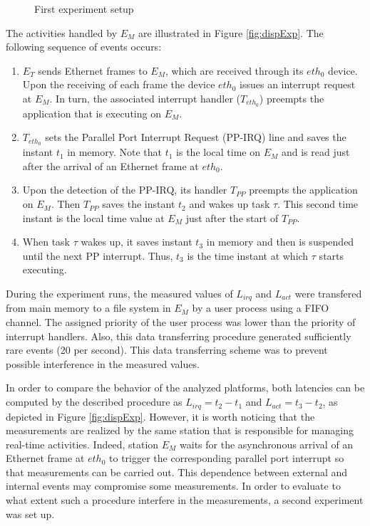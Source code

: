 \documentclass{acm_proc_article-sp}
\begin{document}
\begin{figure}[tbh]
  \centering {\scalebox{1}{}}
  \caption{First experiment setup}
  \label{fig:config}
\end{figure}

The activities handled by $E_M$ are illustrated in Figure \ref{fig:dispExp}. The
following sequence of events occurs:

\begin{enumerate}
\item $E_T$ sends Ethernet frames to $E_M$, which are received through its $eth_0$
  device. Upon the receiving of each frame the device $eth_0$ issues an interrupt
  request at $E_M$. In turn, the associated interrupt handler ($T_{eth_0}$) preempts
  the application that is executing on $E_M$.

\item $T_{eth_0}$ sets the Parallel Port Interrupt Request (PP-IRQ) line and
    saves the instant $t_1$ in memory. Note that $t_1$ is the local time on $E_M$
  and is read just after the arrival of an Ethernet frame at $eth_0$.

\item Upon the detection of the PP-IRQ, its handler $T_{PP}$ preempts the
  application on $E_M$.  Then $T_{PP}$ saves the instant $t_2$ and wakes up task
  $\tau$. This second time instant is the local time value at $E_M$ just after the
  start of $T_{PP}$.
  
\item When task $\tau$ wakes up, it saves instant $t_3$ in memory and then is
  suspended until the next PP interrupt. Thus, $t_3$ is the time instant at which
  $\tau$ starts executing.
\end{enumerate}

During the experiment runs, the measured values of $L_{irq}$ and $L_{act}$ were
transfered from main memory to a file system in $E_M$ by a user process using a FIFO
channel. The assigned priority of the user process was lower than the priority of
interrupt handlers.  Also, this data transferring procedure generated sufficiently rare
events (20 per second). This data transferring scheme was to prevent possible
interference in the measured values.

In order to compare the behavior of the analyzed platforms, both latencies can be
computed by the described procedure as $L_{irq} = t_2 - t_1$ and $L_{act} = t_3 -
t_2$, as depicted in Figure \ref{fig:dispExp}. However, it is worth noticing that
the measurements are realized by the same station that is responsible for managing
real-time activities. Indeed, station $E_M$ waits for the asynchronous arrival of an
Ethernet frame at $eth_0$ to trigger the corresponding parallel port interrupt so
that measurements can be carried out. This dependence between external and internal
events may compromise some measurements. In order to evaluate to what extent such a
procedure interfere in the measurements, a second experiment was set up.
\end{document}
